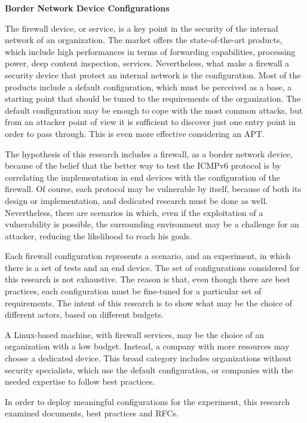 \documentclass[12pt]{article}
\begin{document}
\textbf{Border Network Device Configurations}
\label{subsub:borderConfig}

The firewall device, or service, is a key point in the security of the internal network of an organization. The market offers the state-of-the-art products, which include high performances in terms of forwarding capabilities, processing power, deep content inspection, services. Nevertheless, what make a firewall a security device that protect an internal network is the configuration. Most of the products include a default configuration, which must be perceived as a base, a starting point that should be tuned to the requirements of the organization. The default configuration may be enough to cope with the most common attacks, but from an attacker point of view it is sufficient to discover just one entry point in order to pass through. This is even more effective considering an APT.

The hypothesis of this research includes a firewall, as a border network device, because of the belief that the better way to test the ICMPv6 protocol is by correlating the implementation in end devices with the configuration of the firewall. Of course, each protocol may be vulnerable by itself, because of both its design or implementation, and dedicated research must be done as well. Nevertheless, there are scenarios in which, even if the exploitation of a vulnerability is possible, the surrounding environment may be a challenge for an attacker, reducing the likelihood to reach his goals.

Each firewall configuration represents a scenario, and an experiment, in which there is a set of tests and an end device. The set of configurations considered for this research is not exhaustive. The reason is that, even though there are best practices, each configuration must be fine-tuned for a particular set of requirements. The intent of this research is to show what may be the choice of different actors, based on different budgets.

A Linux-based machine, with firewall services, may be the choice of an organization with a low budget. Instead, a company with more resources may choose a dedicated device. This broad category includes organizations without security specialists, which use the default configuration, or companies with the needed expertise to follow best practices. 

In order to deploy meaningful configurations for the experiment, this research examined documents, best practices and RFCs. 
\end{document}
